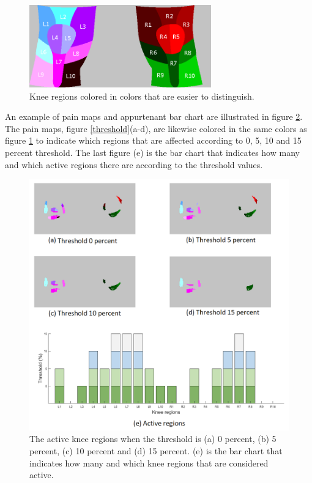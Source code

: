 \begin{figure} [H]
\centering
\includegraphics[width=0.7\textwidth]{figures/colorregion}
\caption{Knee regions colored in colors that are easier to distinguish.}
\label{fig:colorregion}
\end{figure}

\noindent
An example of pain maps and appurtenant bar chart are illustrated in figure \ref{fig:threshold}. The pain maps, figure \ref{threshold}(a-d), are likewise colored in the same colors as figure \ref{fig:colorregion} to indicate which regions that are affected according to 0, 5, 10 and 15 percent threshold. The last figure (e) is the bar chart that indicates how many and which active regions there are according to the threshold values.

\begin{figure} [H]
\centering
\includegraphics[width=1\textwidth]{figures/threshold4}
\caption{The active knee regions when the threshold is (a) 0 percent, (b) 5 percent, (c) 10 percent and (d) 15 percent. (e) is the bar chart that indicates how many and which knee regions that are considered active.}
\label{fig:threshold}
\end{figure}

